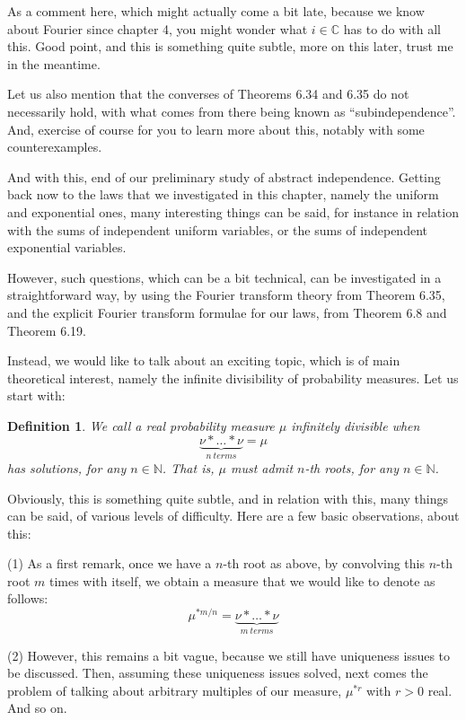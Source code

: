 \documentclass[12pt]{amsbook}
\newtheorem{definition}[theorem]{Definition}
\begin{document}
As a comment here, which might actually come a bit late, because we know about Fourier since chapter 4, you might wonder what $i\in\mathbb C$ has to do with all this. Good point, and this is something quite subtle, more on this later, trust me in the meantime.

\bigskip

Let us also mention that the converses of Theorems 6.34 and 6.35 do not necessarily hold, with what comes from there being known as ``subindependence''. And, exercise of course for you to learn more about this, notably with some counterexamples.

\bigskip

And with this, end of our preliminary study of abstract independence. Getting back now to the laws that we investigated in this chapter, namely the uniform and exponential ones, many interesting things can be said, for instance in relation with the sums of independent uniform variables, or the sums of independent exponential variables.

\bigskip

However, such questions, which can be a bit technical, can be investigated in a straightforward way, by using the Fourier transform theory from Theorem 6.35, and the explicit Fourier transform formulae for our laws, from Theorem 6.8 and Theorem 6.19.

\bigskip

Instead, we would like to talk about an exciting topic, which is of main theoretical interest, namely the infinite divisibility of probability measures. Let us start with: 

\begin{definition}
We call a real probability measure $\mu$ infinitely divisible when
$$\underbrace{\nu*\ldots*\nu}_{n\ terms}=\mu$$
has solutions, for any $n\in\mathbb N$. That is, $\mu$ must admit $n$-th roots, for any $n\in\mathbb N$.
\end{definition}

Obviously, this is something quite subtle, and in relation with this, many things can be said, of various levels of difficulty. Here are a few basic observations, about this:

\bigskip

(1) As a first remark, once we have a $n$-th root as above, by convolving this $n$-th root $m$ times with itself, we obtain a measure that we would like to denote as follows:
$$\mu^{*m/n}=\underbrace{\nu*\ldots*\nu}_{m\ terms}$$

(2) However, this remains a bit vague, because we still have uniqueness issues to be discussed. Then, assuming these uniqueness issues solved, next comes the problem of talking about arbitrary multiples of our measure, $\mu^{*r}$ with $r>0$ real. And so on.
\end{document}
